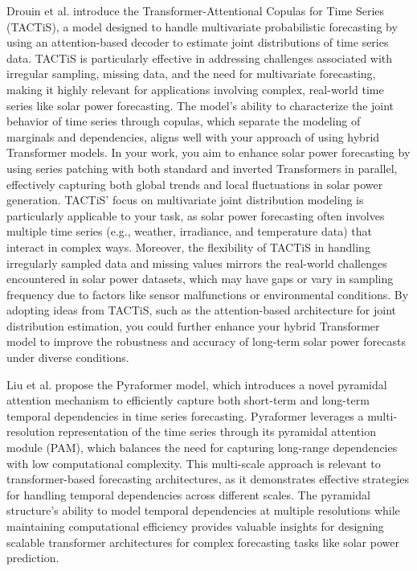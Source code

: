 \documentclass[12pt]{uomthesis}
\begin{document}
Drouin et al. \cite{drouin2022tactis} introduce the Transformer-Attentional Copulas for Time Series (TACTiS), a model designed to handle multivariate probabilistic forecasting by using an attention-based decoder to estimate joint distributions of time series data. TACTiS is particularly effective in addressing challenges associated with irregular sampling, missing data, and the need for multivariate forecasting, making it highly relevant for applications involving complex, real-world time series like solar power forecasting. The model's ability to characterize the joint behavior of time series through copulas, which separate the modeling of marginals and dependencies, aligns well with your approach of using hybrid Transformer models. In your work, you aim to enhance solar power forecasting by using series patching with both standard and inverted Transformers in parallel, effectively capturing both global trends and local fluctuations in solar power generation. TACTiS' focus on multivariate joint distribution modeling is particularly applicable to your task, as solar power forecasting often involves multiple time series (e.g., weather, irradiance, and temperature data) that interact in complex ways. Moreover, the flexibility of TACTiS in handling irregularly sampled data and missing values mirrors the real-world challenges encountered in solar power datasets, which may have gaps or vary in sampling frequency due to factors like sensor malfunctions or environmental conditions. By adopting ideas from TACTiS, such as the attention-based architecture for joint distribution estimation, you could further enhance your hybrid Transformer model to improve the robustness and accuracy of long-term solar power forecasts under diverse conditions.

Liu et al. \cite{liu2021pyraformer} propose the Pyraformer model, which introduces a novel pyramidal attention mechanism to efficiently capture both short-term and long-term temporal dependencies in time series forecasting. Pyraformer leverages a multi-resolution representation of the time series through its pyramidal attention module (PAM), which balances the need for capturing long-range dependencies with low computational complexity. This multi-scale approach is relevant to transformer-based forecasting architectures, as it demonstrates effective strategies for handling temporal dependencies across different scales. The pyramidal structure's ability to model temporal dependencies at multiple resolutions while maintaining computational efficiency provides valuable insights for designing scalable transformer architectures for complex forecasting tasks like solar power prediction.
\end{document}

